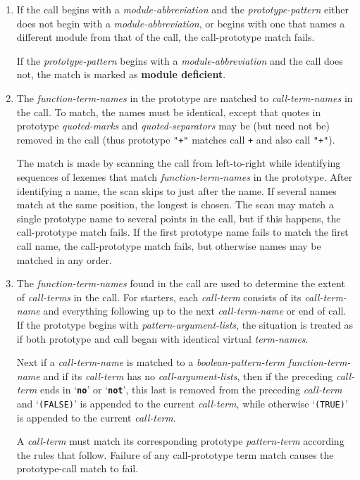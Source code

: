 \documentclass[12pt]{article}
\newcommand{\TT}[1]{{\tt \bfseries #1}}
\newcommand{\key}[1]{{\rm \bfseries #1}}
\begin{document}
\begin{enumerate}
\item If the call begins with a {\em module-abbreviation}
and the {\em prototype-pattern}
either does not begin with a {\em module-abbreviation},
or begins with one that names a different module from that of the call,
the call-prototype match fails.

If the {\em prototype-pattern} begins with a {\em module-abbreviation}
and the call does not, the match is marked as
\key{module deficient}\label{MODULE-DEFICIENT}.

\item The {\em function-term-names} in the prototype are matched to
{\em call-term-names} in the call.  To match, the names must be identical,
except that quotes in prototype
{\em quoted-marks} and {\em quoted-separators} may be (but need not be)
removed in the call
(thus prototype {\tt "+"} matches call {\tt +} and also call {\tt "+"}).

The match is made by scanning the call from left-to-right
while identifying sequences of lexemes that match
{\em function-term-names} in the prototype.  After identifying
a name, the scan skips to just after the name.  If several
names match at the same position, the longest is chosen.
The scan may match a single prototype name to several points in the
call, but if this happens, the call-prototype match fails.
If the first prototype name fails to match the first call name,
the call-prototype match fails, but otherwise names may be matched
in any order.

\item
The {\em function-term-names} found in the call are used to determine
the extent of {\em call-terms} in the call.  For starters, each
{\em call-term} consists of its {\em call-term-name} and everything
following up to the next {\em call-term-name} or end of call.
If the prototype begins
with {\em pattern-argument-lists}, the situation is treated as
if both prototype and call began with identical virtual
{\em term-names}.

Next if a {\em call-term-name} is matched to a {\em boolean-pattern-term}
{\em function-term-name} and if its {\em call-term} has no
{\em call-argument-lists}, then if the preceding {\em call-term}
ends in `\TT{no}' or `\TT{not}', this last is removed from the
preceding {\em call-term} and `{\tt (FALSE)}' is appended to the
current {\em call-term}, while otherwise `{\tt (TRUE)}' is appended to the
current {\em call-term}.

A {\em call-term}
must match its corresponding prototype {\em pattern-term} according
the rules that follow.  Failure of any call-prototype term match
causes the prototype-call match to fail.


\end{enumerate}
\end{document}
